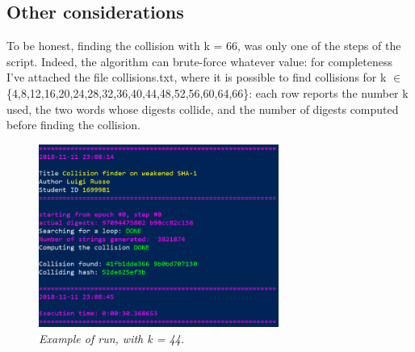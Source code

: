 \documentclass[11 pt]{article}
\begin{document}
\subsection{Other considerations}
To be honest, finding the collision with k = 66, was only one of the steps of the script. Indeed, the algorithm can brute-force whatever value: for completeness I've attached the file collisions.txt, where it is possible to find collisions for k $\in$ \{4,8,12,16,20,24,28,32,36,40,44,48,52,56,60,64,66\}: each row reports the number k used, the two words whose digests collide, and the number of digests computed before finding the collision.

\begin{figure}[!ht]
	\centering %
	\includegraphics[width=0.7\textwidth]{example-hw2-1699981.png} %
	\caption{\textit{Example of run, with k = 44.}} %
	\label{fig:example}
\end{figure}
\end{document}
